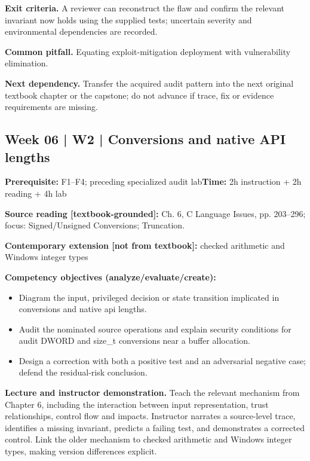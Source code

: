 \documentclass[10pt,letterpaper]{article}
\begin{document}
\textbf{Exit criteria.} A reviewer can reconstruct the flaw and confirm the relevant invariant now holds using the supplied tests; uncertain severity and environmental dependencies are recorded.

\textbf{Common pitfall.} Equating exploit-mitigation deployment with vulnerability elimination.

\textbf{Next dependency.} Transfer the acquired audit pattern into the next original textbook chapter or the capstone; do not advance if trace, fix or evidence requirements are missing.

\subsection{Week 06 | W2 | Conversions and native API lengths}
\textbf{Prerequisite:} F1--F4; preceding specialized audit lab\hfill\textbf{Time:} 2h instruction + 2h reading + 4h lab

\textbf{Source reading [textbook-grounded]:} Ch. 6, C Language Issues, pp. 203--296; focus: Signed/Unsigned Conversions; Truncation.

\textbf{Contemporary extension [not from textbook]:} checked arithmetic and Windows integer types

\textbf{Competency objectives (analyze/evaluate/create):}
\begin{itemize}[leftmargin=*,itemsep=2pt]
\item Diagram the input, privileged decision or state transition implicated in conversions and native api lengths.
\item Audit the nominated source operations and explain security conditions for audit DWORD and size\_t conversions near a buffer allocation.
\item Design a correction with both a positive test and an adversarial negative case; defend the residual-risk conclusion.
\end{itemize}
\textbf{Lecture and instructor demonstration.} Teach the relevant mechanism from Chapter 6, including the interaction between input representation, trust relationships, control flow and impacts. Instructor narrates a source-level trace, identifies a missing invariant, predicts a failing test, and demonstrates a corrected control. Link the older mechanism to checked arithmetic and Windows integer types, making version differences explicit.
\end{document}
